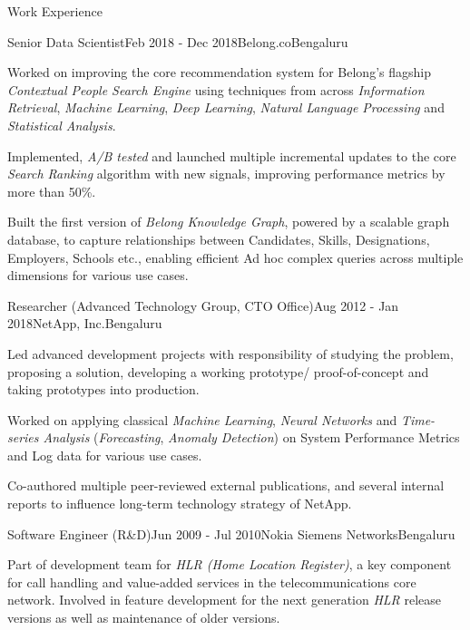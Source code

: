 \documentclass{resume} %
\begin{document}
\begin{rSection}{Work Experience}
\begin{rSubsection}{Senior Data Scientist}{Feb 2018 - Dec 2018}{Belong.co}{Bengaluru}
\item Worked on improving the core recommendation system for Belong's flagship {\em Contextual People Search Engine} using techniques from across {\em Information Retrieval}, {\em Machine Learning}, {\em Deep Learning}, {\em Natural Language Processing} and {\em Statistical Analysis}.
\item Implemented, {\em A/B tested} and launched multiple incremental updates to the core {\em Search Ranking} algorithm with new signals, improving performance metrics by more than 50\%.  
\item Built the first version of {\em Belong Knowledge Graph}, powered by a scalable graph database, to capture relationships between Candidates, Skills,  Designations, Employers, Schools etc., enabling efficient Ad hoc complex queries across multiple dimensions for various use cases.

\end{rSubsection}

\begin{rSubsection}{Researcher (Advanced Technology Group, CTO Office)}{Aug 2012 - Jan 2018}{NetApp, Inc.}{Bengaluru}
\item Led advanced development projects with responsibility of studying the problem, proposing a solution, developing a working prototype/ proof-of-concept and taking prototypes into production.
\item Worked on applying classical {\em Machine Learning}, {\em Neural Networks} and {\em Time-series Analysis} ({\em Forecasting}, {\em Anomaly Detection}) on System Performance Metrics and Log data for various use cases.
\item Co-authored multiple peer-reviewed external publications, and several internal reports to influence long-term technology strategy of NetApp. 
\end{rSubsection}

\begin{rSubsection}{Software Engineer (R\&D)}{Jun 2009 - Jul 2010}{Nokia Siemens Networks}{Bengaluru}
\item Part of development team for {\em HLR (Home Location Register)}, a key component for call handling and value-added services in the telecommunications core network. Involved in feature development for the next generation {\em HLR} release versions as well as maintenance of older versions.

\end{rSubsection}

\end{rSection}
\end{document}
